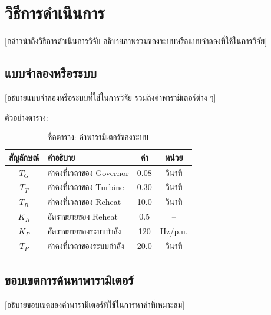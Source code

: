 
\chapter{วิธีการดำเนินการ}

\noindent\hspace{\parindent}%
[กล่าวนำถึงวิธีการดำเนินการวิจัย อธิบายภาพรวมของระบบหรือแบบจำลองที่ใช้ในการวิจัย]

\section{แบบจำลองหรือระบบ}

\noindent\hspace{\parindent}%
[อธิบายแบบจำลองหรือระบบที่ใช้ในการวิจัย รวมถึงค่าพารามิเตอร์ต่าง ๆ]

ตัวอย่างตาราง:
\begin{table}[htbp]
  \centering
  \caption{ชื่อตาราง: ค่าพารามิเตอร์ของระบบ}
  \label{tab:parameters}
  \begin{tabular}{c|l|c|c}
    \toprule
    สัญลักษณ์ & คำอธิบาย & ค่า & หน่วย \\
    \midrule
    $T_G$   & ค่าคงที่เวลาของ Governor     & 0.08  & วินาที \\
    $T_T$   & ค่าคงที่เวลาของ Turbine      & 0.30  & วินาที \\
    $T_R$   & ค่าคงที่เวลาของ Reheat       & 10.0  & วินาที \\
    $K_R$   & อัตราขยายของ Reheat          & 0.5   & -- \\
    $K_P$   & อัตราขยายของระบบกำลัง        & 120   & Hz/p.u. \\
    $T_P$   & ค่าคงที่เวลาของระบบกำลัง     & 20.0  & วินาที \\
    \bottomrule
  \end{tabular}
\end{table}


\section{ขอบเขตการค้นหาพารามิเตอร์}

\noindent\hspace{\parindent}%
[อธิบายขอบเขตของค่าพารามิเตอร์ที่ใช้ในการหาค่าที่เหมาะสม]

